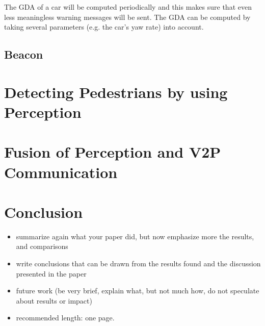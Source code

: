 \documentclass[]{ccs-thesis}
\begin{document}
The \ac{GDA} of a car will be computed periodically and this makes sure that even less meaningless warning messages will be sent. The \ac{GDA} can be computed by taking several parameters (e.g. the car's yaw rate) into account.


\section{Beacon}\label{sec:beacon}

\chapter{Detecting Pedestrians by using Perception}
\label{chap:perception}


\chapter{Fusion of Perception and V2P Communication}\label{chap:fusion}




\chapter{Conclusion}
\label{chap:conclusion}


\begin{itemize}
\item summarize again what your paper did, but now emphasize more the results, and comparisons
\item write conclusions that can be drawn from the results found and the discussion presented in the paper
\item future work (be very brief, explain what, but not much how, do not speculate about results or impact)
\item recommended length: one page.
\end{itemize}



\cleardoublepage

\listofabbreviations
\clearpage

\listoffigures
\clearpage


\printbibliography
\end{document}
